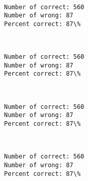 \documentclass[11pt]{article}
\begin{document}
    \begin{center}
    \end{center}
    { \hspace*{\fill} \\}
    
    \begin{Verbatim}[commandchars=\\\{\}]
Number of correct: 560
Number of wrong: 87
Percent correct: 87\%

    \end{Verbatim}

    \begin{center}
    \end{center}
    { \hspace*{\fill} \\}
    
    \begin{Verbatim}[commandchars=\\\{\}]
Number of correct: 560
Number of wrong: 87
Percent correct: 87\%

    \end{Verbatim}

    \begin{center}
    \end{center}
    { \hspace*{\fill} \\}
    
    \begin{Verbatim}[commandchars=\\\{\}]
Number of correct: 560
Number of wrong: 87
Percent correct: 87\%

    \end{Verbatim}

    \begin{center}
    \end{center}
    { \hspace*{\fill} \\}
    
    \begin{Verbatim}[commandchars=\\\{\}]
Number of correct: 560
Number of wrong: 87
Percent correct: 87\%

    \end{Verbatim}
\end{document}
